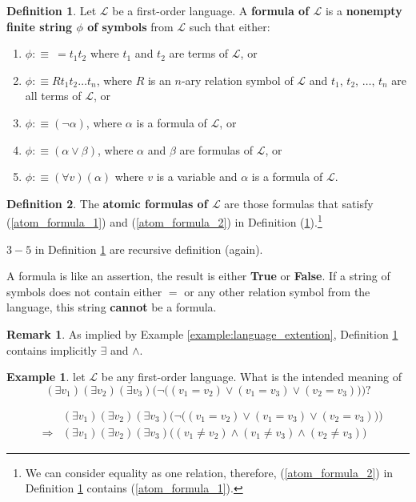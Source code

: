 \documentclass[11pt,letterpaper]{book}
\theoremstyle{definition}
\newtheorem{definition}{Definition}[section]
\newtheorem{remark}{Remark}[section]
\newtheorem{example}{Example}[section]
\begin{document}
\begin{definition}\label{def:formula}
Let $\mathcal{L}$ be a first-order language. A \textbf{formula of
$\mathcal{L}$} is a \textbf{ nonempty finite string $\phi$ of symbols} from
$\mathcal{L}$ such that either:
\begin{enumerate}
\item{$\phi : \equiv\ =t_1 t_2$ where $t_1 $ and $t_2$ are terms of
$\mathcal{L}$, or}\label{atom_formula_1}
\item{$\phi :\equiv R t_1 t_2 \ldots t_n$, where $R$ is an $n$-ary
relation symbol of $\mathcal{L}$ and $t_1$, $t_2$, $\ldots$, $t_n$ are
all terms of $\mathcal{L}$, or}\label{atom_formula_2}
\item{$\phi :\equiv ( \lnot \alpha )$, where $\alpha$ is a formula of
$\mathcal{L}$, or}
\item{$\phi :\equiv (\alpha \lor \beta)$, where $\alpha$ and $\beta$ are
formulas of $\mathcal{L}$, or}
\item{$\phi :\equiv (\forall v) ( \alpha )$ where $v$ is a variable and
$\alpha$ is a formula of $\mathcal{L}$.}
\end{enumerate}
\end{definition}

\begin{definition}\label{def:atomic_formula}
The \textbf{atomic formulas of $\mathcal{L}$} are those formulas that
satisfy (\ref{atom_formula_1}) and (\ref{atom_formula_2}) in Definition
(\ref{def:formula}).\footnote{We can consider equality as one relation,
therefore, (\ref{atom_formula_2}) in Definition \ref{def:formula}
contains (\ref{atom_formula_1}).}
\end{definition}


$3-5$ in Definition \ref{def:formula} are recursive definition (again).

A formula is like an assertion, the result is either \textbf{True} or
\textbf{False}. If a
string of symbols does not contain either $=$ or any other relation
symbol from the language, this string \textbf{cannot} be a formula.

\begin{remark}
As implied by Example \ref{example:language_extention}, Definition
\ref{def:formula} contains implicitly $\exists$ and $\land$.

\end{remark}

\begin{example}
let $\mathcal{L}$ be any first-order language. What is the intended
meaning of
$$ (\exists v_1) (\exists v_2)(\exists v_3) \Big( \lnot \big( (v_1 =
v_2) \lor (v_1 = v_3) \lor (v_2 = v_3) \big) \Big) ? $$

\begin{eqnarray*}
& & (\exists v_1) (\exists v_2)(\exists v_3) \Big( \lnot \big( (v_1 =
v_2) \lor (v_1 = v_3) \lor (v_2 = v_3) \big) \Big) \\
&\Rightarrow& (\exists v_1) (\exists v_2)(\exists v_3) \Big( (v_1 \neq
v_2) \land (v_1 \neq v_3) \land (v_2 \neq v_3) \Big)
\end{eqnarray*}


\end{example}
\end{document}
